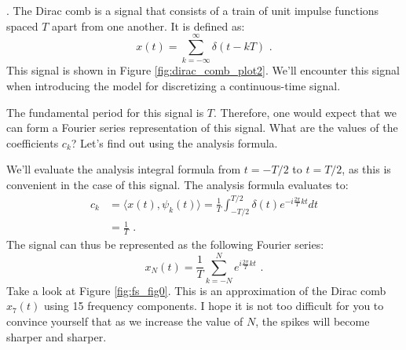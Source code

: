 .
The Dirac comb is a signal that consists of a train of unit impulse functions spaced $T$ apart from one another.
It is defined as:
\begin{equation}
  x(t) = \sum_{k=-\infty}^{\infty} \delta(t - k T) \,\,.
\end{equation}
This signal is shown in Figure \ref{fig:dirac_comb_plot2}. We'll encounter this signal when introducing
the model for discretizing a continuous-time signal.

The fundamental period for this signal is $T$. Therefore, one would expect that we can form a Fourier
series representation of this signal. What are the values of the coefficients $c_k$? Let's find out using the analysis formula.

We'll evaluate the analysis integral formula from $t=-T/2$ to $t=T/2$, as this is convenient in the case of this signal.
The analysis formula evaluates to:
\begin{align}
  c_k & = \langle x(t),\psi_k(t) \rangle = \frac{1}{T} \int_{-T/2}^{T/2} \delta(t) e^{-i\frac{2\pi}{T}kt} dt \\
      & = \frac{1}{T}\label{eq:dirac_comb_coeff} \,\,.
\end{align}
The signal can thus be represented as the following Fourier series:
\begin{equation}
  x_N(t) = \frac{1}{T}\sum_{k=-N}^{N} e^{i\frac{2\pi}{T}kt} \,\,.
\end{equation}
Take a look at Figure \ref{fig:fs_fig0}. This is an approximation of the Dirac comb $x_7(t)$ using 15 frequency components.
I hope it is not too difficult for you to convince yourself that as we increase the value of $N$,
the spikes will become sharper and sharper.

